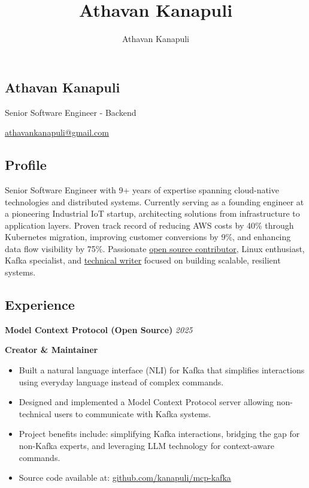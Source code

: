\documentclass[11pt, oneside]{article}
\title{Athavan Kanapuli}
\author{Athavan Kanapuli}
\begin{document}
\begin{center}
\section*{Athavan Kanapuli}
Senior Software Engineer - Backend 

\href{athavankanapuli@gmail.com}{athavankanapuli@gmail.com}
\end{center}

\subsection*{Profile}

Senior Software Engineer with 9+ years of expertise spanning cloud-native technologies and distributed systems. Currently serving as a founding engineer at a pioneering Industrial IoT startup, architecting solutions from infrastructure to application layers. Proven track record of reducing AWS costs by 40\% through Kubernetes migration, improving customer conversions by 9\%, and enhancing data flow visibility by 75\%. Passionate \href{https://github.com/kanapuli}{open source contributor}, Linux enthusiast, Kafka specialist, and \href{https://medium.com/@athavankanapuli}{technical writer} focused on building scalable, resilient systems.

\medskip
\subsection*{Experience}

\textbf{Model Context Protocol (Open Source)}
\hfill
\textit{2025}

\textbf{Creator \& Maintainer}

\begin{itemize}
  \item Built a natural language interface (NLI) for Kafka that simplifies interactions using everyday language instead of complex commands.
  \item Designed and implemented a Model Context Protocol server allowing non-technical users to communicate with Kafka systems.
  \item Project benefits include: simplifying Kafka interactions, bridging the gap for non-Kafka experts, and leveraging LLM technology for context-aware commands.
  \item Source code available at: \href{https://github.com/kanapuli/mcp-kafka}{github.com/kanapuli/mcp-kafka}
\end{itemize}
\end{document}
